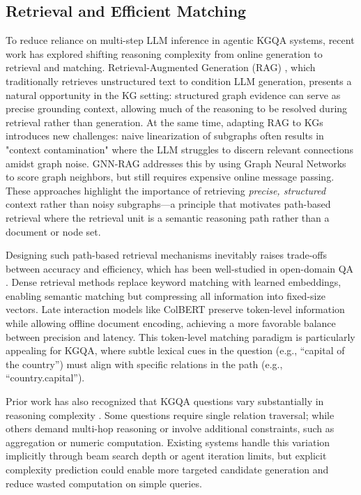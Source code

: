 \documentclass[conference]{IEEEtran}
\begin{document}
\subsection{Retrieval and Efficient Matching}

To reduce reliance on multi-step LLM inference in agentic KGQA systems, recent work has explored shifting reasoning complexity from online generation to retrieval and matching. Retrieval-Augmented Generation (RAG) \cite{lewis2020rag}, which traditionally retrieves unstructured text to condition LLM generation, presents a natural opportunity in the KG setting: structured graph evidence can serve as precise grounding context, allowing much of the reasoning to be resolved during retrieval rather than generation. At the same time, adapting RAG to KGs introduces new challenges: naive linearization of subgraphs \cite{pan2024kg-llm-survey} often results in "context contamination" where the LLM struggles to discern relevant connections amidst graph noise. GNN-RAG \cite{mavromatis2024gnnrag} addresses this by using Graph Neural Networks to score graph neighbors, but still requires expensive online message passing. These approaches highlight the importance of retrieving \emph{precise, structured} context rather than noisy subgraphs---a principle that motivates path-based retrieval where the retrieval unit is a semantic reasoning path rather than a document or node set.

Designing such path-based retrieval mechanisms inevitably raises trade-offs between accuracy and efficiency, which has been well-studied in open-domain QA \cite{gao2021densesurvey}. Dense retrieval methods \cite{karpukhin2020dpr, izacard2022contriever} replace keyword matching with learned embeddings, enabling semantic matching but compressing all information into fixed-size vectors. Late interaction models like ColBERT \cite{khattab2020colbert, santhanam2022colbertv2} preserve token-level information while allowing offline document encoding, achieving a more favorable balance between precision and latency. This token-level matching paradigm is particularly appealing for KGQA, where subtle lexical cues in the question (e.g., “capital of the country”) must align with specific relations in the path (e.g., “country.capital”).

Prior work has also recognized that KGQA questions vary substantially in reasoning complexity \cite{gu2021beyond, cao2022kqa}. Some questions require single relation traversal; while others demand multi-hop reasoning or involve additional constraints, such as aggregation or numeric computation. Existing systems handle this variation implicitly through beam search depth or agent iteration limits, but explicit complexity prediction could enable more targeted candidate generation and reduce wasted computation on simple queries.
\end{document}
